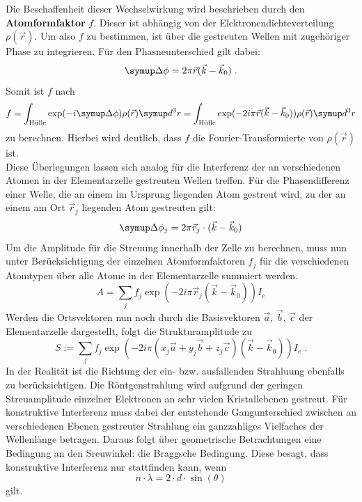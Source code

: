 Die Beschaffenheit dieser Wechselwirkung wird beschrieben durch den \textbf{Atomformfaktor} $f$. Dieser ist abhängig von
der Elektronendichteverteilung $\rho(\vec{r})$. Um also $f$ zu bestimmen, ist über die gestreuten Wellen mit zugehöriger
Phase zu integrieren. Für den Phasneunterschied gilt dabei:
%
\begin{equation}
  \upD\phi=2\pi\vec{r}(\vec{k}-\vec{k}_0) \; .
\end{equation}
%
Somit ist $f$ nach
%
\begin{equation}
  f=\int_\text{Hülle}\exp(-i\upD\phi)\rho(\vec{r})\upd^3r=\int_\text{Hülle}\exp(-2i\pi\vec{r}(\vec{k}-\vec{k}_0))\rho(\vec{r})\upd^3r
\end{equation}
%
zu berechnen. Hierbei wird deutlich, dass $f$ die Fourier-Transformierte von $\rho(\vec{r})$ ist.\\
Diese Überlegungen lassen sich analog für die Interferenz der an verschiedenen Atomen in der Elementarzelle gestreuten Wellen treffen.
Für die Phasendifferenz einer Welle, die an einem im Ursprung liegenden Atom gestreut wird, zu der an einem am Ort $\vec{r}_j$
liegenden Atom gestreuten gilt:
%
\begin{equation}
  \upD\phi_j=2\pi\vec{r}_j\cdot(\vec{k}-\vec{k}_0)
\end{equation}
%
Um die Amplitude für die Streuung innerhalb der Zelle zu berechnen, muss nun unter Berücksichtigung der einzelnen Atomformfaktoren
$f_j$ für die verschiedenen Atomtypen über alle Atome in der Elementarzelle summiert werden.
%
\begin{equation}
  A=\sum_jf_j\exp(-2i\pi\vec{r}_j(\vec{k}-\vec{k}_0))I_e
\end{equation}
%
Werden die Ortsvektoren nun noch durch die Basisvektoren $\vec{a},\,\vec{b},\,\vec{c}$ der Elementarzelle dargestellt, folgt
die Strukturamplitude zu
%
\begin{equation}
  S:=\sum_jf_j\exp(-2i\pi(x_j\vec{a}+y_j\vec{b}+z_j\vec{c})(\vec{k}-\vec{k}_0))I_e \; .
  \label{eq:strukturamplitude}
\end{equation}
%
In der Realität ist die Richtung der ein- bzw. ausfallenden Strahluung ebenfalls zu berücksichtigen. Die Röntgenstrahlung wird aufgrund
der geringen Streuamplitude einzelner Elektronen an sehr vielen Kristallebenen gestreut. Für konstruktive Interferenz muss dabei der
entstehende Gangunterschied zwischen an verschiedenen Ebenen gestreuter Strahlung ein ganzzahliges Vielfaches der Wellenlänge betragen.
Daraus folgt über geometrische Betrachtungen eine Bedingung an den Sreuwinkel: die Braggsche Bedingung. Diese besagt, dass konstruktive
Interferenz nur stattfinden kann, wenn
%
\begin{equation}
  n\cdot\lambda=2\cdot d\cdot\sin(\theta)
  \label{eq:bragg}
\end{equation}
%
gilt.
%
